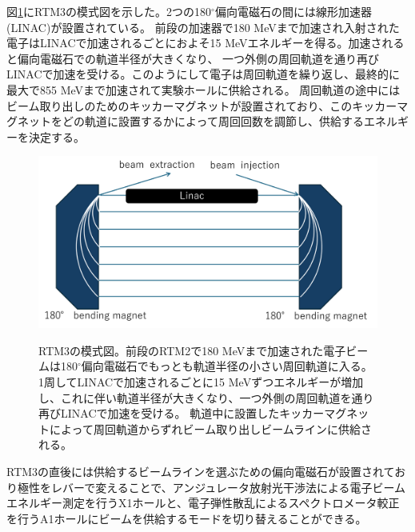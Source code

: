 \documentclass[a4paper,11pt,uplatex]{jsbook}
\begin{document}
図\ref{RTM3}にRTM3の模式図を示した。2つの180$^\circ$偏向電磁石の間には線形加速器(LINAC)が設置されている。
前段の加速器で180 MeVまで加速され入射された電子はLINACで加速されるごとにおよそ15 MeVエネルギーを得る。加速されると偏向電磁石での軌道半径が大きくなり、
一つ外側の周回軌道を通り再びLINACで加速を受ける。このようにして電子は周回軌道を繰り返し、最終的に最大で855 MeVまで加速されて実験ホールに供給される。
周回軌道の途中にはビーム取り出しのためのキッカーマグネットが設置されており、このキッカーマグネットをどの軌道に設置するかによって周回回数を調節し、供給するエネルギーを決定する。
\begin{figure}
  \centering
  \includegraphics[width=0.8\linewidth]{image/3-RTM.png}\\
  \caption[RTM3の模式図]{RTM3の模式図。前段のRTM2で180 MeVまで加速された電子ビームは180$^\circ$偏向電磁石でもっとも軌道半径の小さい周回軌道に入る。
  1周してLINACで加速されるごとに15 MeVずつエネルギーが増加し、これに伴い軌道半径が大きくなり、一つ外側の周回軌道を通り再びLINACで加速を受ける。
  軌道中に設置したキッカーマグネットによって周回軌道からずれビーム取り出しビームラインに供給される。}
  \label{RTM3}
\end{figure}

RTM3の直後には供給するビームラインを選ぶための偏向電磁石が設置されており極性をレバーで変えることで、アンジュレータ放射光干渉法による電子ビームエネルギー測定を行うX1ホールと、電子弾性散乱によるスペクトロメータ較正を行うA1ホールにビームを供給するモードを切り替えることができる。
\end{document}
